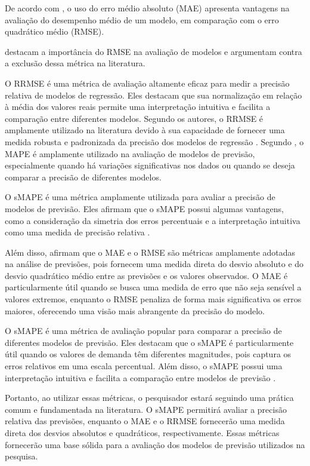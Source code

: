 De acordo com , o uso do erro médio absoluto (MAE) apresenta vantagens na avaliação do desempenho médio de um modelo, em comparação com o erro quadrático médio (RMSE).

 destacam a importância do RMSE na avaliação de modelos e argumentam contra a exclusão dessa métrica na literatura.


O RRMSE é uma métrica de avaliação altamente eficaz para medir a precisão relativa de modelos de regressão. Eles destacam que sua normalização em relação à média dos valores reais permite uma interpretação intuitiva e facilita a comparação entre diferentes modelos. Segundo os autores, o RRMSE é amplamente utilizado na literatura devido à sua capacidade de fornecer uma medida robusta e padronizada da precisão dos modelos de regressão \cite{lopes2020evaluation}. Segundo , o MAPE é amplamente utilizado na avaliação de modelos de previsão, especialmente quando há variações significativas nos dados ou quando se deseja comparar a precisão de diferentes modelos.

O sMAPE é uma métrica amplamente utilizada para avaliar a precisão de modelos de previsão. Eles afirmam que o sMAPE possui algumas vantagens, como a consideração da simetria dos erros percentuais e a interpretação intuitiva como uma medida de precisão relativa \cite{nguyen2020toxicological}.

Além disso,  afirmam que o MAE e o RMSE são métricas amplamente adotadas na análise de previsões, pois fornecem uma medida direta do desvio absoluto e do desvio quadrático médio entre as previsões e os valores observados. O MAE é particularmente útil quando se busca uma medida de erro que não seja sensível a valores extremos, enquanto o RMSE penaliza de forma mais significativa os erros maiores, oferecendo uma visão mais abrangente da precisão do modelo.

O sMAPE é uma métrica de avaliação popular para comparar a precisão de diferentes modelos de previsão. Eles destacam que o sMAPE é particularmente útil quando os valores de demanda têm diferentes magnitudes, pois captura os erros relativos em uma escala percentual. Além disso, o sMAPE possui uma interpretação intuitiva e facilita a comparação entre modelos de previsão \cite{hyndman2006effect}.


Portanto, ao utilizar essas métricas, o pesquisador estará seguindo uma prática comum e fundamentada na literatura. O sMAPE permitirá avaliar a precisão relativa das previsões, enquanto o MAE e o RRMSE fornecerão uma medida direta dos desvios absolutos e quadráticos, respectivamente. Essas métricas fornecerão uma base sólida para a avaliação dos modelos de previsão utilizados na pesquisa.



